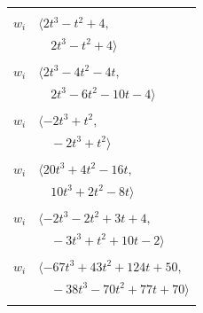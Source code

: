 \documentclass[11pt]{article}
\begin{document}
\begin{longtable}{@{}ll@{}}
\addlinespace[2pt]
\multicolumn{2}{@{}p{0.97\textwidth}@{}}{$i=23$, $D_i=1$, $\rho_{ij}$: $9{:}1, \allowbreak 22{:}1, \allowbreak 31{:}2, \allowbreak 32{:}1, \allowbreak 37{:}1, \allowbreak 38{:}2$}\\
$w_i$ & $\langle 2t^{3}-t^{2}+4,$\\
 & $\quad 2t^{3}-t^{2}+4\rangle$\\
\addlinespace[2pt]
\multicolumn{2}{@{}p{0.97\textwidth}@{}}{$i=24$, $D_i=2$, $\rho_{ij}$: $0{:}2, \allowbreak 2{:}1, \allowbreak 6{:}1, \allowbreak 7{:}2, \allowbreak 14{:}2, \allowbreak 16{:}2$}\\
$w_i$ & $\langle 2t^{3}-4t^{2}-4t,$\\
 & $\quad 2t^{3}-6t^{2}-10t-4\rangle$\\
\addlinespace[2pt]
\multicolumn{2}{@{}p{0.97\textwidth}@{}}{$i=25$, $D_i=1$, $\rho_{ij}$: $13{:}2, \allowbreak 22{:}2, \allowbreak 31{:}1$}\\
$w_i$ & $\langle -2t^{3}+t^{2},$\\
 & $\quad -2t^{3}+t^{2}\rangle$\\
\addlinespace[2pt]
\multicolumn{2}{@{}p{0.97\textwidth}@{}}{$i=26$, $D_i=2$, $\rho_{ij}$: $12{:}1, \allowbreak 14{:}1, \allowbreak 15{:}2, \allowbreak 22{:}1, \allowbreak 28{:}2, \allowbreak 29{:}2, \allowbreak 31{:}2, \allowbreak 33{:}1, \allowbreak 37{:}2$}\\
$w_i$ & $\langle 20t^{3}+4t^{2}-16t,$\\
 & $\quad 10t^{3}+2t^{2}-8t\rangle$\\
\addlinespace[2pt]
\multicolumn{2}{@{}p{0.97\textwidth}@{}}{$i=27$, $D_i=2$, $\rho_{ij}$: $5{:}1, \allowbreak 8{:}2, \allowbreak 15{:}2, \allowbreak 19{:}1, \allowbreak 21{:}1, \allowbreak 28{:}1, \allowbreak 39{:}1$}\\
$w_i$ & $\langle -2t^{3}-2t^{2}+3t+4,$\\
 & $\quad -3t^{3}+t^{2}+10t-2\rangle$\\
\addlinespace[2pt]
\multicolumn{2}{@{}p{0.97\textwidth}@{}}{$i=28$, $D_i=2$, $\rho_{ij}$: $3{:}1, \allowbreak 6{:}2, \allowbreak 7{:}1, \allowbreak 26{:}1, \allowbreak 27{:}2, \allowbreak 29{:}1, \allowbreak 31{:}1, \allowbreak 34{:}2, \allowbreak 38{:}1$}\\
$w_i$ & $\langle -67t^{3}+43t^{2}+124t+50,$\\
 & $\quad -38t^{3}-70t^{2}+77t+70\rangle$\\
\addlinespace[2pt]
\multicolumn{2}{@{}p{0.97\textwidth}@{}}{$i=29$, $D_i=4$, $\rho_{ij}$: $3{:}1, \allowbreak 4{:}1, \allowbreak 5{:}1, \allowbreak 9{:}2, \allowbreak 15{:}2, \allowbreak 26{:}1, \allowbreak 28{:}2, \allowbreak 31{:}2, \allowbreak 35{:}1, \allowbreak 39{:}2$}\\

\end{longtable}
\end{document}
